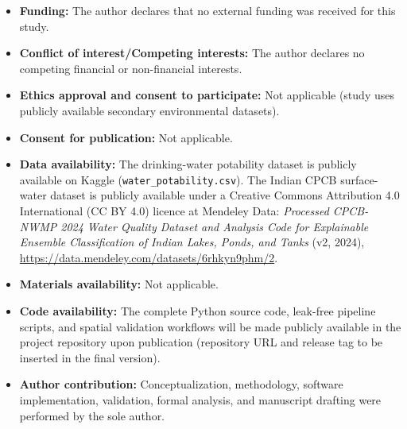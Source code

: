 \documentclass[pdflatex,sn-mathphys-num]{sn-jnl}%
\theoremstyle{thmstyleone}%
\theoremstyle{thmstyletwo}%
\theoremstyle{thmstylethree}%
\begin{document}
\begin{itemize}
\item \textbf{Funding:} The author declares that no external funding was received for this study.
\item \textbf{Conflict of interest/Competing interests:} The author declares no competing financial or non-financial interests.
\item \textbf{Ethics approval and consent to participate:} Not applicable (study uses publicly available secondary environmental datasets).
\item \textbf{Consent for publication:} Not applicable.
\item \textbf{Data availability:} The drinking-water potability dataset is publicly available on Kaggle (\texttt{water\_potability.csv}). The Indian CPCB surface-water dataset is publicly available under a Creative Commons Attribution 4.0 International (CC BY 4.0) licence at Mendeley Data: \textit{Processed CPCB-NWMP 2024 Water Quality Dataset and Analysis Code for Explainable Ensemble Classification of Indian Lakes, Ponds, and Tanks} (v2, 2024), \url{https://data.mendeley.com/datasets/6rhkyn9phm/2}.
\item \textbf{Materials availability:} Not applicable.
\item \textbf{Code availability:} The complete Python source code, leak-free pipeline scripts, and spatial validation workflows will be made publicly available in the project repository upon publication (repository URL and release tag to be inserted in the final version).
\item \textbf{Author contribution:} Conceptualization, methodology, software implementation, validation, formal analysis, and manuscript drafting were performed by the sole author.
\end{itemize}
\end{document}
